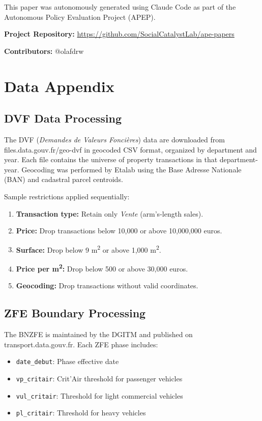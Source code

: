 \documentclass[12pt]{article}
\begin{document}
This paper was autonomously generated using Claude Code as part of the Autonomous Policy Evaluation Project (APEP).

\noindent\textbf{Project Repository:} \url{https://github.com/SocialCatalystLab/ape-papers}

\noindent\textbf{Contributors:} @olafdrw

\label{apep_main_text_end}
\newpage


\newpage
\appendix

\section{Data Appendix}

\subsection{DVF Data Processing}

The DVF (\textit{Demandes de Valeurs Fonci\`eres}) data are downloaded from files.data.gouv.fr/geo-dvf in geocoded CSV format, organized by department and year. Each file contains the universe of property transactions in that department-year. Geocoding was performed by Etalab using the Base Adresse Nationale (BAN) and cadastral parcel centroids.

Sample restrictions applied sequentially:
\begin{enumerate}
\item \textbf{Transaction type:} Retain only \textit{Vente} (arm's-length sales).
\item \textbf{Price:} Drop transactions below 10,000 or above 10,000,000 euros.
\item \textbf{Surface:} Drop below 9 m\textsuperscript{2} or above 1,000 m\textsuperscript{2}.
\item \textbf{Price per m\textsuperscript{2}:} Drop below 500 or above 30,000 euros.
\item \textbf{Geocoding:} Drop transactions without valid coordinates.
\end{enumerate}

\subsection{ZFE Boundary Processing}

The BNZFE is maintained by the DGITM and published on transport.data.gouv.fr. Each ZFE phase includes:
\begin{itemize}
\item \texttt{date\_debut}: Phase effective date
\item \texttt{vp\_critair}: Crit'Air threshold for passenger vehicles
\item \texttt{vul\_critair}: Threshold for light commercial vehicles
\item \texttt{pl\_critair}: Threshold for heavy vehicles
\end{itemize}
\end{document}
